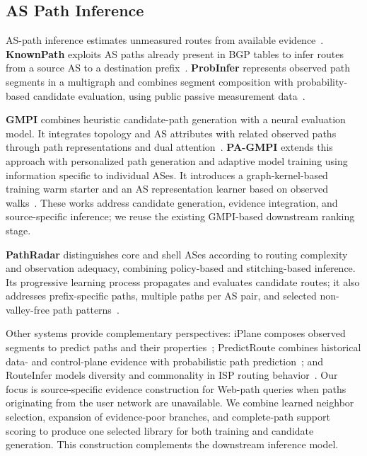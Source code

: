 \documentclass[sigconf,anonymous,review]{acmart}
\begin{document}
\subsection{AS Path Inference}

AS-path inference estimates unmeasured routes from available
evidence~\cite{li2024internet}.
\textbf{KnownPath} exploits AS paths already present in BGP tables to infer
routes from a source AS to a destination prefix~\cite{qiu2005path}.
\textbf{ProbInfer} represents observed path segments in a multigraph and
combines segment composition with probability-based candidate evaluation,
using public passive measurement data~\cite{probinfer}.

\textbf{GMPI} combines heuristic candidate-path generation with a neural
evaluation model. It integrates topology and AS attributes with related
observed paths through path representations and dual
attention~\cite{li2023realizing}.
\textbf{PA-GMPI} extends this approach with personalized path generation
and adaptive model training using information specific to individual
ASes. It introduces a graph-kernel-based training warm starter and an AS
representation learner based on observed walks~\cite{li2024realizing}.
These works address candidate generation, evidence integration, and
source-specific inference; we reuse the existing GMPI-based downstream
ranking stage.

\textbf{PathRadar} distinguishes core and shell ASes according to routing
complexity and observation adequacy, combining policy-based and
stitching-based inference. Its progressive learning process propagates and
evaluates candidate routes; it also addresses prefix-specific paths,
multiple paths per AS pair, and selected non-valley-free path
patterns~\cite{11044440}.

Other systems provide complementary perspectives: iPlane composes observed
segments to predict paths and their properties~\cite{madhyastha2006iplane,madhyastha2009iplane};
PredictRoute combines historical data- and control-plane evidence with
probabilistic path prediction~\cite{singh2021predictroute}; and RouteInfer
models diversity and commonality in ISP routing
behavior~\cite{wang2022routeinfer}. Our focus is source-specific evidence
construction for Web-path queries when paths originating from the user
network are unavailable. We combine learned neighbor selection, expansion
of evidence-poor branches, and complete-path support scoring to produce
one selected library for both training and candidate generation. This
construction complements the downstream inference model.
\end{document}
